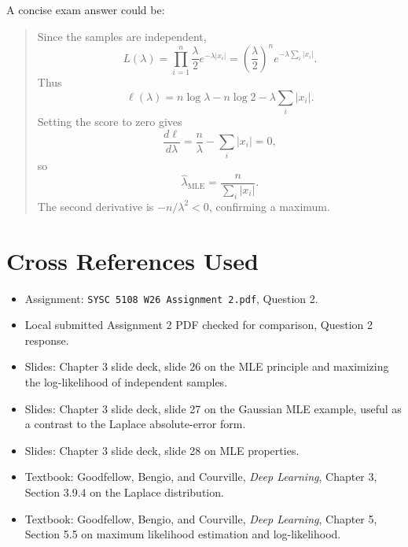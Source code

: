 \documentclass[11pt]{article}
\begin{document}
A concise exam answer could be:
\begin{quote}
Since the samples are independent,
\[
L(\lambda)
=
\prod_{i=1}^{n}\frac{\lambda}{2}e^{-\lambda |x_i|}
=
\left(\frac{\lambda}{2}\right)^n
e^{-\lambda\sum_i |x_i|}.
\]
Thus
\[
\ell(\lambda)=n\log\lambda-n\log 2-\lambda\sum_i |x_i|.
\]
Setting the score to zero gives
\[
\frac{d\ell}{d\lambda}
=
\frac{n}{\lambda}-\sum_i |x_i|
=0,
\]
so
\[
\hat{\lambda}_{\mathrm{MLE}}
=
\frac{n}{\sum_i |x_i|}.
\]
The second derivative is $-n/\lambda^2<0$, confirming a maximum.
\end{quote}

\section*{Cross References Used}

\begin{itemize}
\item Assignment: \texttt{SYSC 5108 W26 Assignment 2.pdf}, Question 2.
\item Local submitted Assignment 2 PDF checked for comparison, Question 2 response.
\item Slides: Chapter 3 slide deck, slide 26 on the MLE principle and maximizing the log-likelihood of independent samples.
\item Slides: Chapter 3 slide deck, slide 27 on the Gaussian MLE example, useful as a contrast to the Laplace absolute-error form.
\item Slides: Chapter 3 slide deck, slide 28 on MLE properties.
\item Textbook: Goodfellow, Bengio, and Courville, \textit{Deep Learning}, Chapter 3, Section 3.9.4 on the Laplace distribution.
\item Textbook: Goodfellow, Bengio, and Courville, \textit{Deep Learning}, Chapter 5, Section 5.5 on maximum likelihood estimation and log-likelihood.
\end{itemize}
\end{document}
